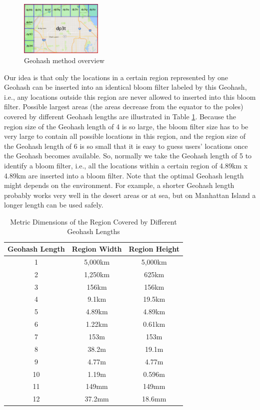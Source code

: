 \begin{figure}
    \centering %
    \includegraphics[width=0.35\textwidth]{./figures/geohash.pdf}
    \caption{Geohash method overview}\label{fig:geohash}\vspace{-0.1in}
\end{figure}

Our idea is that only the locations in a certain region represented by one Geohash can be inserted into an identical bloom filter labeled by this Geohash, i.e., any locations outside this region are never allowed to inserted into this bloom filter. Possible largest areas (the areas decrease from the equator to the poles) covered by different Geohash lengths are illustrated in Table \ref{tab:geohash_region_size}. Because the region size of the Geohash length of 4 is so large, the bloom filter size has to be very large to contain all possible locations in this region, and the region size of the Geohash length of 6 is so small that it is easy to guess users' locations once the Geohash becomes available. So, normally we take the Geohash length of 5 to identify a bloom filter, i.e., all the locations within a certain region of 4.89km x 4.89km are inserted into a bloom filter. Note that the optimal Geohash length might depends on the environment. For example, a shorter Geohash length probably works very well in the desert areas or at sea, but on Manhattan Island a longer length can be used safely.

\begin{table}[]
\centering
\footnotesize
\caption{Metric Dimensions of the Region Covered by Different Geohash Lengths}
\label{tab:geohash_region_size}
\begin{tabular}{|c|c|c|}
\hline
Geohash Length & Region Width & Region Height \\
\hline
1 & 5,000km & 5,000km \\
2 & 1,250km & 625km \\
3 & 156km & 156km \\
4 & 9.1km & 19.5km \\
5 & 4.89km & 4.89km \\
6 & 1.22km & 0.61km \\
7 & 153m & 153m \\
8 & 38.2m & 19.1m \\
9 & 4.77m & 4.77m \\
10 & 1.19m & 0.596m \\
11 & 149mm & 149mm \\
12 & 37.2mm & 18.6mm \\
\hline
\end{tabular}
\normalsize
\vspace{-0.1in}
\end{table}

